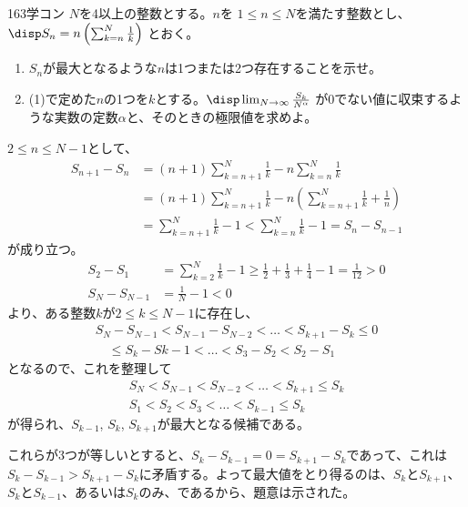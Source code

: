 \begin{prob}{163}{\maru}{学コン}
 $N$を4以上の整数とする。$n$を $1\le n \le N$を満たす整数とし、$\disp S_n=n\left(\sum_{k=n}^N \frac{1}{k}\right)$ とおく。
 \begin{enumerate}
  \item $S_n$が最大となるような$n$は1つまたは2つ存在することを示せ。
  \item (1)で定めた$n$の1つを$k$とする。$\disp \lim_{N\to\infty} \frac{S_k}{N^\alpha}$ が0でない値に収束するような実数の定数$\alpha$と、そのときの極限値を求めよ。
 \end{enumerate}
\end{prob}

$2\le n\le N-1$として、
\begin{align*}
 S_{n+1}-S_n&=(n+1)\sum_{k=n+1}^N\frac{1}{k}-n\sum_{k=n}^N\frac{1}{k} \\
 &=(n+1)\sum_{k=n+1}^N\frac{1}{k}-n\left(\sum_{k=n+1}^N\frac{1}{k}+\frac{1}{n}\right) \\
 &=\sum_{k=n+1}^N\frac{1}{k}-1 < \sum_{k=n}^N\frac{1}{k}-1 = S_n-S_{n-1}
\end{align*}
が成り立つ。
\begin{align*}
 S_2-S_1&=\sum_{k=2}^N\frac{1}{k} -1 \ge \frac{1}{2}+\frac{1}{3}+\frac{1}{4}-1=\frac{1}{12}>0 \\
 S_N-S_{N-1}&=\frac{1}{N}-1 < 0
\end{align*}
より、ある整数$k$が$2\le k\le N-1$に存在し、
\begin{align*}
 S_N-S_{N-1}<S_{N-1}-S_{N-2}<\dots <S_{k+1}-S_{k}\le 0 \\
 \quad \le S_{k}-S{k-1}<\dots <S_3-S_2<S_2-S_1
\end{align*}
となるので、これを整理して
\begin{align*}
 S_N<S_{N-1}<S_{N-2}<\dots<S_{k+1}\le S_k \\
 S_1<S_2<S_3<\dots<S_{k-1}\le S_k
\end{align*}
が得られ、$S_{k-1}$, $S_k$, $S_{k+1}$が最大となる候補である。

これらが3つが等しいとすると、$S_k-S_{k-1}=0=S_{k+1}-S_k$であって、これは$S_k-S_{k-1}>S_{k+1}-S_k$に矛盾する。よって最大値をとり得るのは、$S_k$と$S_{k+1}$、$S_k$と$S_{k-1}$、あるいは$S_k$のみ、であるから、題意は示された。

